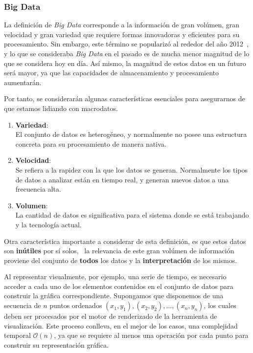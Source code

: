 \subsubsection{Big Data}

La definición de \textit{Big Data} corresponde a la información de gran volúmen, gran velocidad y gran variedad que requiere formas innovadoras y eficientes para su procesamiento. Sin embargo, este término se popularizó al rededor del año 2012~\cite{diebold2012bigdata}, y lo que se consideraba \textit{Big Data} en el pasado es de mucha menor magnitud de lo que se considera hoy en día. Así mismo, la magnitud de estos datos en un futuro será mayor, ya que las capacidades de almacenamiento y procesamiento aumentarán.

Por tanto, se considerarán algunas características esenciales para asegurarnos de que estamos lidiando con macrodatos.
\begin{enumerate}
    \item \textbf{Variedad}: \\
        El conjunto de datos es heterogéneo, y normalmente no posee una estructura concreta para su procesamiento de manera nativa.
    \item \textbf{Velocidad}: \\
        Se refiera a la rapidez con la que los datos se generan. Normalmente los tipos de datos a analizar están en tiempo real, y generan nuevos datos a una frecuencia alta.
    \item \textbf{Volumen}: \\
        La cantidad de datos es significativa para el sistema donde se está trabajando y la tecnología actual.
\end{enumerate}

Otra característica importante a considerar de esta definición, es que estos datos son \textbf{inútiles} por sí solos,~\cite{gandomi2015beyond} la relevancia de este gran volúmen de información proviene del conjunto de \textbf{todos} los datos y la \textbf{interpretación} de los mismos. 

Al representar visualmente, por ejemplo, una serie de tiempo, es necesario acceder a cada uno de los elementos contenidos en el conjunto de datos para construir la gráfica correspondiente. Supongamos que disponemos de una secuencia de \( n \) puntos ordenados \((x_1, y_1), (x_2, y_2), \ldots, (x_n, y_n)\), los cuales deben ser procesados por el motor de renderizado de la herramienta de visualización. Este proceso conlleva, en el mejor de los casos, una complejidad temporal \(\mathcal{O}(n)\), ya que se requiere al menos una operación por cada punto para construir su representación gráfica.

